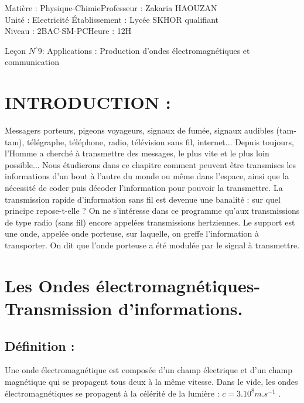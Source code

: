 \documentclass[12pt]{article}
\author{Zakaria HAOUZAN}
\date{\today}
\newcommand\headerMe[2]{\noindent{}#1\hfill#2}
\begin{document}
\headerMe{Matière : Physique-Chimie}{Professeur : Zakaria HAOUZAN}\\
\headerMe{Unité : Electricité }{Établissement : Lycée SKHOR qualifiant}\\
\headerMe{Niveau : 2BAC-SM-PC}{Heure : 12H}\\

\begin{center}

    \Large{Leçon $N^{\circ} 9 $: \color{red}Applications : Production d'ondes électromagnétiques et
communication }
\end{center}


\section{INTRODUCTION : }

Messagers porteurs, pigeons voyageurs, signaux de fumée, signaux audibles (tam-tam), télégraphe, téléphone,
radio, télévision sans fil, internet... Depuis toujours, l’Homme a cherché à transmettre des messages, le plus vite
et le plus loin possible... Nous étudierons dans ce chapitre comment peuvent être transmises les informations
d’un bout à l’autre du monde ou même dans l’espace, ainsi que la nécessité de coder puis décoder l’information
pour pouvoir la transmettre.
La transmission rapide d’information sans fil est devenue une banalité : sur quel principe repose-t-elle ?
On ne s’intéresse dans ce programme qu’aux transmissions de type radio (sans fil) encore appelées
transmissions hertziennes. Le support est une onde, appelée onde porteuse, sur laquelle, on greffe l’information
à transporter. On dit que l’onde porteuse a été modulée par le signal à transmettre.

\section{Les Ondes électromagnétiques- Transmission d'informations. }



\subsection{Définition : }
Une onde électromagnétique est composée d’un champ électrique et d’un champ magnétique qui se
propagent tous deux à la même vitesse. Dans le vide, les ondes électromagnétiques se propagent à la célérité
de la lumière : $c = 3.10^8 m.s^{-1}$ . 
\end{document}

